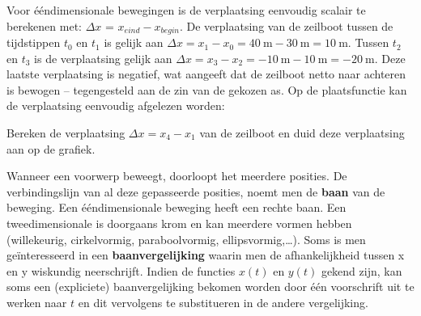 \documentclass{ximera}
\begin{document}
Voor ééndimensionale bewegingen is de verplaatsing eenvoudig scalair te berekenen met: $\Delta x$ = $x_{eind}-x_{begin}$.
De verplaatsing van de zeilboot tussen de tijdstippen $t_0$ en $t_1$ is gelijk aan \( \Delta x = x_1-x_0 = \SI{40}{\meter} - \SI{30}{\meter} = \SI{10}{\meter}\).  
Tussen $t_2$ en $t_3$ is de verplaatsing gelijk aan \(\Delta x = x_3 - x_2=\SI{-10}{\meter} - \SI{10}{\meter} = \SI{-20}{\meter}\). 
Deze laatste verplaatsing is negatief, wat aangeeft dat de zeilboot netto naar achteren is bewogen -- tegengesteld aan de zin van de gekozen as.
Op de plaatsfunctie kan de verplaatsing eenvoudig afgelezen worden: 

\begin{image}
\end{image}

\begin{quickquestion*}{}{}
Bereken de verplaatsing \(\Delta x = x_4 - x_1\) van de zeilboot en duid deze verplaatsing aan op de grafiek.  
\end{quickquestion*}


Wanneer een voorwerp beweegt, doorloopt het meerdere posities. 
De verbindingslijn van al deze gepasseerde posities, noemt men de \textbf{baan} van de beweging. 
Een ééndimensionale beweging heeft een rechte baan. 
Een tweedimensionale is doorgaans krom en kan meerdere vormen hebben (willekeurig, cirkelvormig, paraboolvormig, ellipsvormig,\ldots). 
Soms is men geïnteresseerd in een \textbf{baanvergelijking} waarin men de afhankelijkheid tussen x en y wiskundig neerschrijft.
Indien de functies \(x(t)\) en \(y(t)\) gekend zijn, kan soms een (expliciete) baanvergelijking bekomen worden door één voorschrift uit te werken naar \(t\) en dit vervolgens te substitueren in de andere vergelijking.
\end{document}
